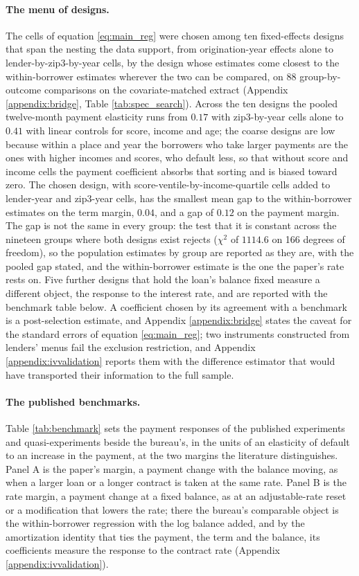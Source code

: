 \paragraph{The menu of designs.} The cells of equation \eqref{eq:main_reg} were chosen among ten fixed-effects designs that span the nesting the data support, from origination-year effects alone to lender-by-zip3-by-year cells, by the design whose estimates come closest to the within-borrower estimates wherever the two can be compared, on 88 group-by-outcome comparisons on the covariate-matched extract (Appendix \ref{appendix:bridge}, Table \ref{tab:spec_search}). Across the ten designs the pooled twelve-month payment elasticity runs from $0.17$ with zip3-by-year cells alone to $0.41$ with linear controls for score, income and age; the coarse designs are low because within a place and year the borrowers who take larger payments are the ones with higher incomes and scores, who default less, so that without score and income cells the payment coefficient absorbs that sorting and is biased toward zero. The chosen design, with score-ventile-by-income-quartile cells added to lender-year and zip3-year cells, has the smallest mean gap to the within-borrower estimates on the term margin, $0.04$, and a gap of $0.12$ on the payment margin. The gap is not the same in every group: the test that it is constant across the nineteen groups where both designs exist rejects ($\chi^2$ of $1114.6$ on 166 degrees of freedom), so the population estimates by group are reported as they are, with the pooled gap stated, and the within-borrower estimate is the one the paper's rate rests on. Five further designs that hold the loan's balance fixed measure a different object, the response to the interest rate, and are reported with the benchmark table below. A coefficient chosen by its agreement with a benchmark is a post-selection estimate, and Appendix \ref{appendix:bridge} states the caveat for the standard errors of equation \eqref{eq:main_reg}; two instruments constructed from lenders' menus fail the exclusion restriction, and Appendix \ref{appendix:ivvalidation} reports them with the difference estimator that would have transported their information to the full sample.

\paragraph{The published benchmarks.} Table \ref{tab:benchmark} sets the payment responses of the published experiments and quasi-experiments beside the bureau's, in the units of an elasticity of default to an increase in the payment, at the two margins the literature distinguishes. Panel A is the paper's margin, a payment change with the balance moving, as when a larger loan or a longer contract is taken at the same rate. Panel B is the rate margin, a payment change at a fixed balance, as at an adjustable-rate reset or a modification that lowers the rate; there the bureau's comparable object is the within-borrower regression with the log balance added, and by the amortization identity that ties the payment, the term and the balance, its coefficients measure the response to the contract rate (Appendix \ref{appendix:ivvalidation}). 

